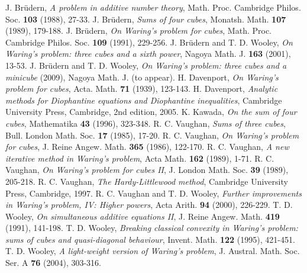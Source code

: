 \documentclass[12pt,english,reqno]{amsart}
\theoremstyle{definition}
\theoremstyle{remark}
\numberwithin{equation}{section}
\numberwithin{equation}{section}
\numberwithin{figure}{section}
\theoremstyle{plain}
\theoremstyle{plain}
\theoremstyle{plain}
\theoremstyle{plain}
\numberwithin{equation}{section}
\numberwithin{thm}{section}
\begin{document}
\begin{thebibliography}{18}
J. Br\"{u}dern, \textit{A problem in additive
number theory}, Math. Proc. Cambridge Philos. Soc. \textbf{103} (1988),
27-33.
J. Br\"{u}dern, \textit{Sums of four cubes},
Monatsh. Math. \textbf{107} (1989), 179-188.
J. Br\"{u}dern, \textit{On Waring's problem for
cubes}, Math. Proc. Cambridge Philos. Soc. \textbf{109} (1991), 229-256.
J. Br\"{u}dern and T. D. Wooley, \textit{On
Waring's problem: three cubes and a sixth power}, Nagoya Math. J.
\textbf{163} (2001), 13-53.
J. Br\"{u}dern and T. D. Wooley, \textit{On
Waring's problem: three cubes and a minicube} (2009), Nagoya Math.
J. (to appear).
H. Davenport, \textit{On Waring's problem
for cubes}, Acta. Math. \textbf{71} (1939), 123-143.
H. Davenport, \textit{Analytic methods
for Diophantine equations and Diophantine inequalities}, Cambridge
University Press, Cambridge, 2nd edition, 2005.
K. Kawada, \textit{On the sum of four cubes},
Mathematika \textbf{43} (1996), 323-348.
R. C. Vaughan, \textit{Sums of three cubes},
Bull. London Math. Soc. \textbf{17} (1985), 17-20.
R. C. Vaughan, \textit{On Waring's problem
for cubes}, J. Reine Angew. Math. \textbf{365} (1986), 122-170.
R. C. Vaughan, \textit{A new iterative method
in Waring's problem}, Acta Math. \textbf{162} (1989), 1-71.
R. C. Vaughan, \textit{On Waring's problem
for cubes II}, J. London Math. Soc. \textbf{39} (1989), 205-218.
R. C. Vaughan, \textit{The Hardy-Littlewood
method}, Cambridge University Press, Cambridge, 1997.
R. C. Vaughan and T. D. Wooley, \textit{Further
improvements in Waring's problem, IV: Higher powers}, Acta Arith.
\textbf{94} (2000), 226-229.
T. D. Wooley, \textit{On simultaneous additive
equations II}, J. Reine Angew. Math. \textbf{419} (1991), 141-198.
T. D. Wooley, \textit{Breaking classical
convexity in Waring's problem: sums of cubes and quasi-diagonal behaviour},
Invent. Math. \textbf{122} (1995), 421-451.
T. D. Wooley, \textit{A light-weight version
of Waring's problem}, J. Austral. Math. Soc. Ser. A \textbf{76} (2004),
303-316.
\end{thebibliography}
\end{document}
